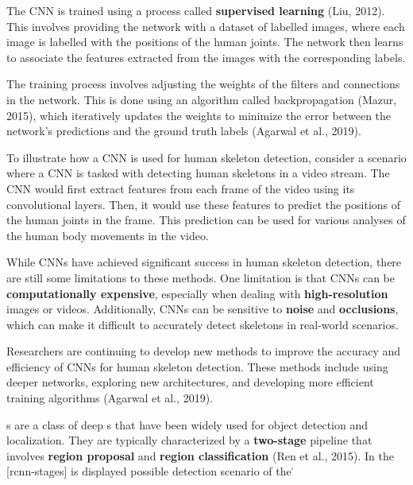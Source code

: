 
The CNN is trained using a process called {\bf supervised learning} (\scc Liu, 2012). This involves providing the network with a dataset of labelled images, where each image is labelled with the positions of the human joints. The network then learns to associate the features extracted from the images with the corresponding labels.

The training process involves adjusting the weights of the filters and connections in the network. This is done using an algorithm called backpropagation (\scc Mazur, 2015), which iteratively updates the weights to minimize the error between the network's predictions and the ground truth labels (\scc Agarwal et al., 2019).


To illustrate how a CNN is used for human skeleton detection, consider a scenario where a CNN is tasked with detecting human skeletons in a video stream. The CNN would first extract features from each frame of the video using its convolutional layers. Then, it would use these features to predict the positions of the human joints in the frame. This prediction can be used for various analyses of the human body movements in the video.


While CNNs have achieved significant success in human skeleton detection, there are still some limitations to these methods. One limitation is that CNNs can be {\bf computationally expensive}, especially when dealing with {\bf high-resolution} images or videos. Additionally, CNNs can be sensitive to {\bf noise} and {\bf occlusions}, which can make it difficult to accurately detect skeletons in real-world scenarios.

Researchers are continuing to develop new methods to improve the accuracy and efficiency of CNNs for human skeleton detection. These methods include using deeper networks, exploring new architectures, and developing more efficient training algorithms (\scc Agarwal et al., 2019).

\RCNN\-s are a class of deep \CNN\-s that have been widely used for object detection and localization. They are typically characterized by a {\bf two-stage} pipeline that involves {\bf region proposal} and {\bf region classification} (\scc Ren et al., 2015). In the [rcnn-stages] is displayed possible detection scenario of the \RCNN\.

